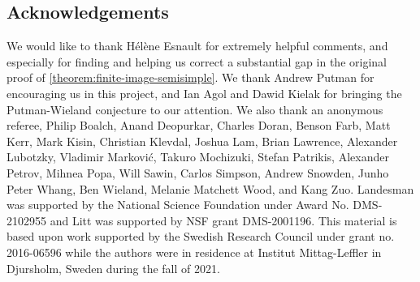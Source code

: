 \subsection{Acknowledgements}

We would like to thank H\'el\`ene Esnault
for extremely helpful comments, and especially for finding and helping us correct a substantial gap in the original proof of \autoref{theorem:finite-image-semisimple}. We thank Andrew Putman for encouraging us in this project, and Ian Agol and Dawid Kielak for bringing the Putman-Wieland conjecture to our attention.
We also thank an anonymous referee,
Philip Boalch,
Anand Deopurkar,
Charles Doran,
Benson Farb,
Matt Kerr,
Mark Kisin,
Christian Klevdal,
Joshua Lam,
Brian Lawrence,
Alexander Lubotzky,
Vladimir Markovi\'c,
Takuro Mochizuki,
Stefan Patrikis,
Alexander Petrov,
Mihnea Popa,
Will Sawin,
Carlos Simpson,
Andrew Snowden,
Junho Peter Whang,
Ben Wieland,
Melanie Matchett Wood,
and Kang Zuo.
Landesman was supported by the National Science Foundation under Award No. DMS-2102955
and Litt was supported by NSF grant DMS-2001196.
This material is based upon work supported by the Swedish Research Council under grant no. 2016-06596 while the authors were in residence at Institut Mittag-Leffler in Djursholm, Sweden during the fall of 2021.
